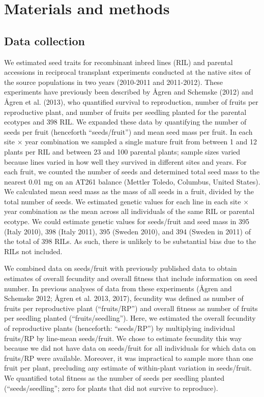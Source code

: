 \documentclass[]{article}
\begin{document}
\hypertarget{materials-and-methods}{%
\section{Materials and methods}\label{materials-and-methods}}

\hypertarget{data-collection}{%
\subsection{Data collection}\label{data-collection}}

We estimated seed traits for recombinant inbred lines (RIL) and parental accessions in reciprocal transplant experiments conducted at the native sites of the source populations in two years (2010-2011 and 2011-2012). These experiments have previously been described by Ågren and Schemske (2012) and Ågren et al. (2013), who quantified survival to reproduction, number of fruits per reproductive plant, and number of fruits per seedling planted for the parental ecotypes and 398 RIL. We expanded these data by quantifying the number of seeds per fruit (henceforth ``seeds/fruit'') and mean seed mass per fruit. In each site × year combination we sampled a single mature fruit from between 1 and 12 plants per RIL and between 23 and 100 parental plants; sample sizes varied because lines varied in how well they survived in different sites and years. For each fruit, we counted the number of seeds and determined total seed mass to the nearest 0.01 mg on an AT261 balance (Mettler Toledo, Columbus, United States). We calculated mean seed mass as the mass of all seeds in a fruit, divided by the total number of seeds. We estimated genetic values for each line in each site × year combination as the mean across all individuals of the same RIL or parental ecotype. We could estimate genetic values for seeds/fruit and seed mass in 395 (Italy 2010), 398 (Italy 2011), 395 (Sweden 2010), and 394 (Sweden in 2011) of the total of 398 RILs. As such, there is unlikely to be substantial bias due to the RILs not included.

We combined data on seeds/fruit with previously published data to obtain estimates of overall fecundity and overall fitness that include information on seed number. In previous analyses of data from these experiments (Ågren and Schemske 2012; Ågren et al. 2013, 2017), fecundity was defined as number of fruits per reproductive plant (``fruits/RP'') and overall fitness as number of fruits per seedling planted (``fruits/seedling''). Here, we estimated the overall fecundity of reproductive plants (henceforth: ``seeds/RP'') by multiplying individual fruits/RP by line-mean seeds/fruit. We chose to estimate fecundity this way because we did not have data on seeds/fruit for all individuals for which data on fruits/RP were available. Moreover, it was impractical to sample more than one fruit per plant, precluding any estimate of within-plant variation in seeds/fruit. We quantified total fitness as the number of seeds per seedling planted (``seeds/seedling''; zero for plants that did not survive to reproduce).
\end{document}
